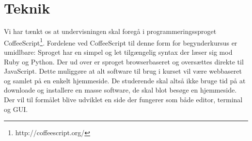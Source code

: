 \documentclass[11pt,a4paper]{article}
\begin{document}
\section{Teknik}
Vi har tænkt os at undervisningen skal foregå i programmeringssproget 
CoffeeScript\footnote{http://coffeescript.org/}. Fordelene ved CoffeeScript
til denne form for begynderkursus er umidlbare: Sproget har en simpel og let 
tilgængelig syntax der læser sig mod Ruby og Python. Der ud over er sproget
browserbaseret og oversættes direkte til JavaScript. Dette muliggøre at alt 
software til brug i kurset vil være webbaseret og samlet på en enkelt hjemmeside.
De studerende skal altså ikke bruge tid på at downloade og installere en masse
software, de skal blot besøge en hjemmeside. Der vil til formålet blive udviklet
en side der fungerer som både editor, terminal og GUI.

\end{document}
